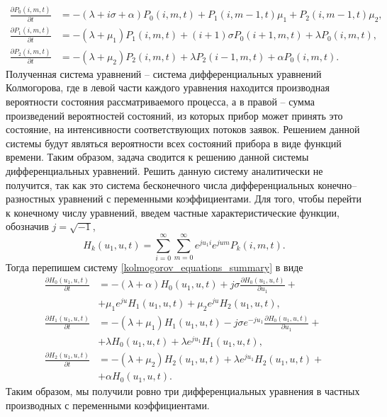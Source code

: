 \begin{equation} \label{kolmogorov_equations_summary}
	\begin{split}
		\frac{{\partial P_{0}(i,m,t)}}{{\partial t}} &= -(\lambda + i\sigma + \alpha)P_{0}(i,m,t) + P_{1}(i,m-1,t)\mu_{1} + P_{2}(i,m-1,t)\mu_{2},
		\\
		\frac{{\partial P_{1}(i,m,t)}}{{\partial t}} &= -(\lambda + \mu_{1})P_{1}(i,m,t) + (i+1)\sigma P_{0}(i+1,m,t) + \lambda  P_{0}(i,m,t),
		\\
		\frac{{\partial P_{2}(i,m,t)}}{{\partial t}} &= -(\lambda + \mu_{2})P_{2}(i,m,t) + \lambda P_{2}(i-1,m,t) + \alpha  P_{0}(i,m,t).
	\end{split}
\end{equation}	
Полученная система уравнений – система дифференциальных уравнений Колмогорова, где в левой части каждого уравнения находится производная вероятности состояния рассматриваемого процесса, а в правой – сумма произведений вероятностей состояний, из которых прибор может принять это состояние, на интенсивности соответствующих потоков заявок. Решением данной системы будут являться вероятности всех состояний прибора в виде функций времени. Таким образом, задача сводится к решению данной системы дифференциальных уравнений.
Решить данную систему аналитически не получится, так как это система бесконечного числа дифференциальных конечно--разностных уравнений с переменными коэффициентами. 
Для того, чтобы перейти к конечному числу уравнений, введем частные характеристические функции, обозначив $j=\sqrt{-1}$,
\begin{equation*}
	H_{k}(u_{1},u,t) = \sum_{i=0}^{\infty}
	\sum_{m=0}^{\infty}  
	e^{ju_{1}i}e^{jum} P_{k}(i,m,t).
\end{equation*}
Тогда перепишем систему \eqref{kolmogorov_equations_summary} в виде
\begin{equation} \label{characteristic_equations_summary}
	\begin{split}
		\frac{{\partial H_{0}(u_{1},u,t)}}{{\partial t}} &= -(\lambda + \alpha)H_{0}(u_{1},u,t) + j\sigma
		\frac{{\partial H_{0}(u_{1},u,t)}}{{\partial u_{1}}} +\\  &+ \mu_{1} e^{ju}H_{1}(u_{1},u,t) + \mu_{2}e^{ju}H_{2}(u_{1},u,t) ,
		\\
		\frac{{\partial H_{1}(u_{1},u,t)}}{{\partial t}} &= -(\lambda + \mu_{1})H_{1}(u_{1},u,t) - j\sigma e^{-ju_{1}}
		\frac{{\partial H_{0}(u_{1},u,t)}}{{\partial u_{1}}} +\\  &+ \lambda H_{0}(u_{1},u,t) + \lambda e^{ju_{1}}H_{1}(u_{1},u,t) ,
		\\
		\frac{{\partial H_{2}(u_{1},u,t)}}{{\partial t}} &= -(\lambda + \mu_{2})H_{2}(u_{1},u,t)  + \lambda e^{ju_{1}}H_{2}(u_{1},u,t) +\\  &+ \alpha H_{0}(u_{1},u,t).
	\end{split}
\end{equation}  
Таким образом, мы получили ровно три дифференциальных уравнения в частных производных с переменными коэффициентами.
